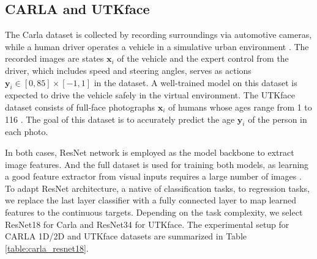 \documentclass{article}
\theoremstyle{plain}
\theoremstyle{definition}
\theoremstyle{remark}
\newcommand{\by}{{\mathbf y}}
\newcommand{\byi}{{\mathbf y}_i}
\newcommand{\bxi}{{\mathbf x}_i}
\begin{document}


\subsection{CARLA and UTKface}
The Carla dataset is collected by recording surroundings via automotive cameras, while a human driver operates a vehicle in a simulative urban environment \citep{Codevilla2018}. The recorded images are states $\bxi$ of the vehicle and the expert control from the driver, which includes speed and steering angles, serves as actions $\by_i \in[0, 85]\times  [-1, 1]$ in the dataset. A well-trained model on this dataset is expected to drive the vehicle safely in the virtual environment. The UTKface dataset consists of full-face photographs $\bxi$ of humans whose ages range from 1 to 116 \citep{zhifei2017cvpr}. The goal of this dataset is to accurately predict the age $\byi$ of the person in each photo.

In both cases, ResNet network \citep{he2016deep} is employed as the model backbone to extract image features. And the full dataset is used for training both models, as learning a good feature extractor from visual inputs requires a large number of images \citep{he2016deep, sun2017revisiting}. To adapt ResNet architecture, a native of classification tasks, to regression tasks, we replace the last layer classifier with a fully connected layer to map learned features to the continuous targets. Depending on the task complexity, we select ResNet18 for Carla and ResNet34 for UTKface. The experimental setup for CARLA 1D/2D and UTKface datasets are summarized in Table \ref{table:carla_resnet18}. 
\end{document}
